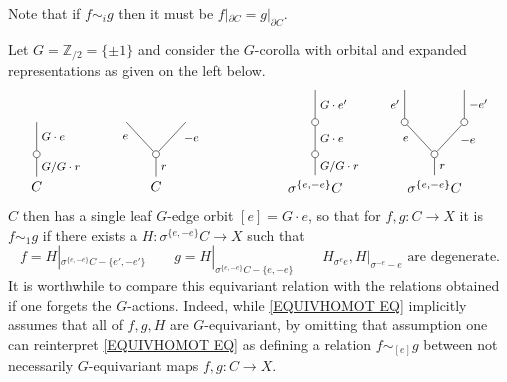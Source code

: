 \documentclass[a4paper,10pt
,draft
]{article}%
\renewcommand{\1}{\eta}%
\begin{document}
\begin{remark}\label{HOMOTBOUND REM}
	Note that if $f \sim_i g$ then it must be
	$f|_{\partial C} = g|_{\partial C}$.
\end{remark}


\begin{example}\label{EQUIVSIM EX}
	Let $G = \mathbb{Z}_{/2} = \{\pm 1\}$
	and consider the $G$-corolla with orbital and expanded representations as given on the left below.
\[
\begin{tikzpicture}
[grow=up,auto,level distance=2.3em,every node/.style = {font=\footnotesize},dummy/.style={circle,draw,inner sep=0pt,minimum size=1.75mm}]
	\node at (0,0) [font=\normalsize]{$C$}
		child{node [dummy] {}
			child{
			edge from parent node [swap] {$G \cdot e$}
node [name=Kone,swap] {}}
		edge from parent node [swap] {$G/G \cdot r$}
		};
	\node at (3,0) [font=\normalsize]{$C$}
		child{node [dummy] {}
			child{
			edge from parent node [swap,near end] {$-e$} node [name=Kn] {}}
			child{
			edge from parent node [near end] {$e$}
node [name=Kone,swap] {}}
		edge from parent node [swap] {$r$}
		};
	\node at (7,0) [font=\normalsize]{$\sigma^{\{e,-e\}} C$}
		child{node [dummy] {}
			child{node [dummy] {}
				child{
				edge from parent node [swap] {$G \cdot e'$}
node [swap] {}}
			edge from parent node [swap] {$G \cdot e$}
node [swap] {}}
		edge from parent node [swap] {$G/G \cdot r$}
		};
	\node at (10,0) [font=\normalsize]{$\sigma^{\{e,-e\}} C$}
		child{node [dummy] {}
			child{node [dummy] {}
				child{
				edge from parent node [swap] {$-e'$} node {}}
			edge from parent node [swap,near end] {$-e$} node {}}
			child{node [dummy] {}
				child{
				edge from parent node {$e'$}
node [swap] {}}
			edge from parent node [near end] {$e$}
node [swap] {}}
		edge from parent node [swap] {$r$}
		};
\end{tikzpicture}
\]
$C$ then has a single leaf $G$-edge orbit $[e] = G \cdot e$, so that for
$f,g \colon C \to X$ it is
$f \sim_1 g$
if there exists a 
$H \colon \sigma^{\{e,-e\}}C \to X$
such that 
\begin{equation}\label{EQUIVHOMOT EQ}
	f = H|_{\sigma^{\{e,-e\}}C - \{e',-e'\}}
\qquad
	g = H|_{\sigma^{\{e,-e\}}C - \{e,-e\}}
\qquad
	H_{\sigma^e e}, H|_{\sigma^{-e}-e} \text{ are degenerate}.
\end{equation}
It is worthwhile to compare this equivariant relation with the relations obtained if one forgets the $G$-actions. Indeed, while \eqref{EQUIVHOMOT EQ} implicitly assumes that all of $f,g,H$ are $G$-equivariant,
by omitting that assumption one can reinterpret 
\eqref{EQUIVHOMOT EQ}
as defining a relation
$f \sim_{[e]} g$ between not necessarily $G$-equivariant maps $f,g \colon C \to X$.


\end{example}
\end{document}
